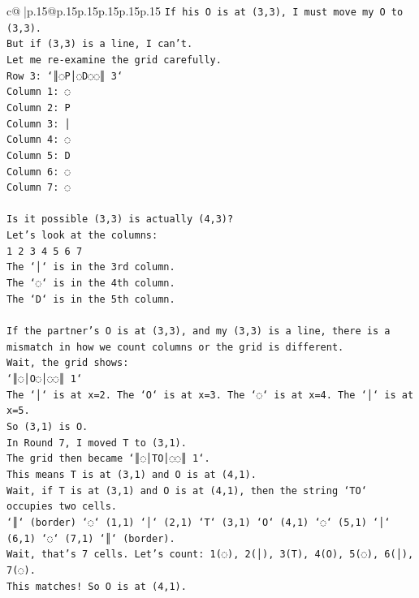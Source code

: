 \documentclass{article}
\begin{document}
{\begin{supertabular}{c@{$\;$}|p{.15\linewidth}@{}p{.15\linewidth}p{.15\linewidth}p{.15\linewidth}p{.15\linewidth}p{.15\linewidth}}
{{{\texttt{If his O is at (3,3), I must move my O to (3,3).} \\
\texttt{But if (3,3) is a line, I can't.} \\
\texttt{Let me re{-}examine the grid carefully.} \\
\texttt{Row 3: `║◌P│◌D◌◌║ 3`} \\
\texttt{Column 1: ◌} \\
\texttt{Column 2: P} \\
\texttt{Column 3: │} \\
\texttt{Column 4: ◌} \\
\texttt{Column 5: D} \\
\texttt{Column 6: ◌} \\
\texttt{Column 7: ◌} \\
\\ 
\texttt{Is it possible (3,3) is actually (4,3)?} \\
\texttt{Let's look at the columns:} \\
\texttt{1 2 3 4 5 6 7} \\
\texttt{The `│` is in the 3rd column.} \\
\texttt{The `◌` is in the 4th column.} \\
\texttt{The `D` is in the 5th column.} \\
\\ 
\texttt{If the partner's O is at (3,3), and my (3,3) is a line, there is a mismatch in how we count columns or the grid is different.} \\
\texttt{Wait, the grid shows:} \\
\texttt{`║◌│O◌│◌◌║ 1`} \\
\texttt{The `│` is at x=2. The `O` is at x=3. The `◌` is at x=4. The `│` is at x=5.} \\
\texttt{So (3,1) is O.} \\
\texttt{In Round 7, I moved T to (3,1).} \\
\texttt{The grid then became `║◌│TO│◌◌║ 1`.} \\
\texttt{This means T is at (3,1) and O is at (4,1).} \\
\texttt{Wait, if T is at (3,1) and O is at (4,1), then the string `TO` occupies two cells.} \\
\texttt{`║` (border) `◌` (1,1) `│` (2,1) `T` (3,1) `O` (4,1) `◌` (5,1) `│` (6,1) `◌` (7,1) `║` (border).} \\
\texttt{Wait, that's 7 cells. Let's count: 1(◌), 2(│), 3(T), 4(O), 5(◌), 6(│), 7(◌).} \\
\texttt{This matches! So O is at (4,1).} \\
}}}
\end{supertabular}}
\end{document}
